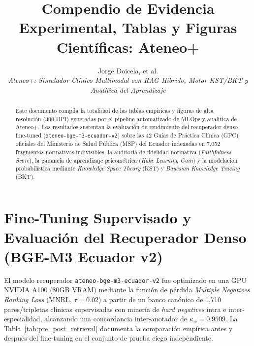 \documentclass[10pt,journal,compsoc]{IEEEtran}
\title{Compendio de Evidencia Experimental, Tablas y Figuras Científicas: Ateneo+}
\author{Jorge Doicela, et al.\\\textit{Ateneo+: Simulador Clínico Multimodal con RAG Híbrido, Motor KST/BKT y Analítica del Aprendizaje}}
\begin{document}
\maketitle

\begin{abstract}
Este documento compila la totalidad de las tablas empíricas y figuras de alta resolución (300 DPI) generadas por el pipeline automatizado de MLOps y analítica de Ateneo+. Los resultados sustentan la evaluación de rendimiento del recuperador denso fine-tuned (\texttt{ateneo-bge-m3-ecuador-v2}) sobre las 42 Guías de Práctica Clínica (GPC) oficiales del Ministerio de Salud Pública (MSP) del Ecuador indexadas en 7,052 fragmentos normativos indivisibles, la auditoría de fidelidad normativa (\textit{Faithfulness Score}), la ganancia de aprendizaje psicométrica (\textit{Hake Learning Gain}) y la modelación probabilística mediante \textit{Knowledge Space Theory} (KST) y \textit{Bayesian Knowledge Tracing} (BKT).
\end{abstract}

\section{Fine-Tuning Supervisado y Evaluación del Recuperador Denso (BGE-M3 Ecuador v2)}

El modelo recuperador \texttt{ateneo-bge-m3-ecuador-v2} fue optimizado en una GPU NVIDIA A100 (80GB VRAM) mediante la función de pérdida \textit{Multiple Negatives Ranking Loss} (MNRL, $\tau=0.02$) a partir de un banco canónico de 1,710 pares/tripletas clínicas supervisadas con minería de \textit{hard negatives} intra e inter-especialidad, alcanzando una concordancia inter-anotador de $\kappa_w = 0.9509$. La Tabla~\ref{tab:pre_post_retrieval} documenta la comparación empírica antes y después del fine-tuning en el conjunto de prueba ciego independiente.
\end{document}

